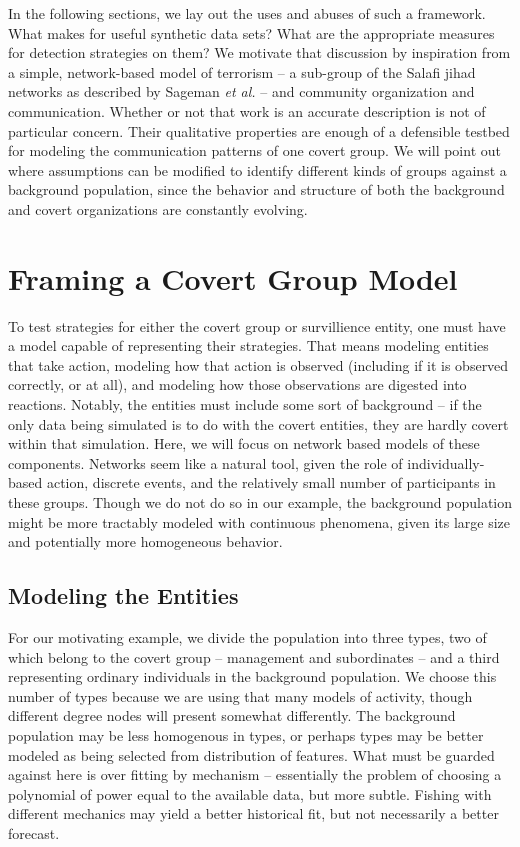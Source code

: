 \documentclass{article}
\begin{document}
In the following sections, we lay out the uses and abuses of such a framework.  What makes for useful synthetic data sets? What are the appropriate measures for detection strategies on them?  We motivate that discussion by inspiration from a simple, network-based model of terrorism -- a sub-group of the Salafi jihad networks as described by Sageman {\em et al.}\cite{sageman} -- and community organization and communication.  Whether or not that work is an accurate description is not of particular concern.  Their qualitative properties are enough of a defensible testbed for modeling the communication patterns of one covert group. We will point out where assumptions can be modified to identify different kinds of groups against a background population, since the behavior and structure of both the background and covert organizations are constantly evolving. 

\section*{Framing a Covert Group Model}
To test strategies for either the covert group or survillience entity, one must have a model capable of representing their strategies.  That means modeling entities that take action, modeling how that action is observed (including if it is observed correctly, or at all), and modeling how those observations are digested into reactions.  Notably, the entities must include some sort of background -- if the only data being simulated is to do with the covert entities, they are hardly covert within that simulation.  Here, we will focus on network based models of these components.  Networks seem like a natural tool, given the role of individually-based action, discrete events, and the relatively small number of participants in these groups.  Though we do not do so in our example, the background population might be more tractably modeled with continuous phenomena, given its large size and potentially more homogeneous behavior.

\subsection*{Modeling the Entities}
For our motivating example, we divide the population into three types, two of which belong to the covert group -- management and subordinates -- and a third representing ordinary individuals in the background population.  We choose this number of types because we are using that many models of activity, though different degree nodes will present somewhat differently.  The background population may be less homogenous in types, or perhaps types may be better modeled as being selected from distribution of features.  What must be guarded against here is over fitting by mechanism -- essentially the problem of choosing a polynomial of power equal to the available data, but more subtle.  Fishing with different mechanics may yield a better historical fit, but not necessarily a better forecast.
\end{document}
